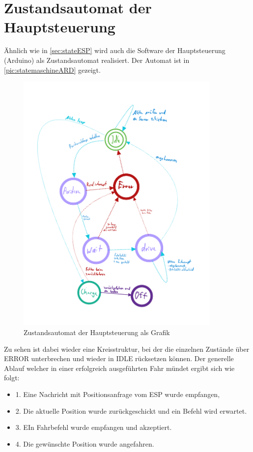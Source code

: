 \section{Zustandsautomat der Hauptsteuerung}
\label{sec:stateARD}
Ähnlich wie in \autoref{sec:stateESP} wird auch die Software der Hauptsteuerung (Arduino) als Zustandsautomat realisiert. 
Der Automat ist in \autoref{pic:statemaschineARD} gezeigt.

\begin{figure}[h]
	\begin{center}
		\includegraphics[width=10cm]{stateMaschineARD.pdf}
		\caption{\label{pic:statemaschineARD}Zustandsautomat der Hauptsteuerung als Grafik}
	\end{center}
\end{figure}
\newpage
Zu sehen ist dabei wieder eine Kreisstruktur, bei der die einzelnen Zustände über ERROR unterbrechen und wieder in IDLE rücksetzen können. Der generelle Ablauf welcher in einer erfolgreich ausgeführten Fahr mündet ergibt sich wie folgt:

\begin{center}
	\begin{itemize}
		\item 1. Eine Nachricht mit Positionsanfrage vom ESP wurde empfangen,
		\item 2. Die aktuelle Position wurde zurückgeschickt und ein Befehl wird erwartet.
		\item 3. EIn Fahrbefehl wurde empfangen und akzeptiert.
		\item 4. Die gewünschte Position wurde angefahren.
	\end{itemize}
\end{center}

